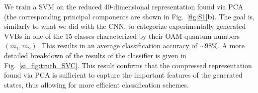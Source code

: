 \documentclass[
    floatfix, aps, pra, superscriptaddress,
	10pt, twocolumn,
    nofootinbib,
	tightenlines
]{revtex4-1}
\begin{document}
We train a \ac{SVM} on the reduced $40$-dimensional representation found via \ac{PCA} (the corresponding principal components are shown in Fig.~\ref{fig:S1}\textbf{b}). The goal is, similarly to what we did with the \ac{CNN}, to categorize experimentally generated \acp{VVB} in one of the $15$ classes characterized by their OAM quantum numbers $(m_1,m_2)$.
This results in an average classification accuracy of $\sim 98 \%$.
A more detailed breakdown of the results of the classifier is given in Fig.~\ref{si_fig:truth_SVC}.
This result confirms that the compressed representation found via \ac{PCA} is sufficient to capture the important features of the generated states, thus allowing for more efficient classification schemes.




\end{document}
